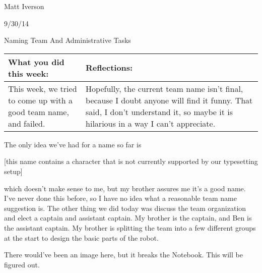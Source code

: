 Matt Iverson

9/30/14

Naming Team And Administrative Tasks

\begin{tabular}{|p{5cm}|p{5cm}|}
 \hline
 What you did this week: &
 Reflections: \\
 \hline
 This week, we tried to come up with a good team name, and failed. &
 Hopefully, the current team name isn’t final, because I doubt anyone will find it funny. That said, I don’t understand it, so maybe it is hilarious in a way I can’t appreciate. \\
 \hline
\end{tabular}

The only idea we’ve had for a name so far is

[this name contains a character that is not currently supported by our typesetting setup]

which doesn’t make sense to me, but my brother assures me it’s a good name. I’ve never done this before, so I have no idea what a reasonable team name suggestion is.
	The other thing we did today was discuss the team organization and elect a captain and assistant captain. My brother is the captain, and Ben is the assistant captain. My brother is splitting the team into a few different groups at the start to design the basic parts of the robot.

There would've been an image here, but it breaks the Notebook. This will be figured out.
